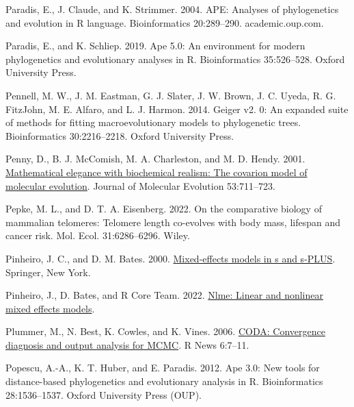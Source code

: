 \documentclass[fleqn,10pt,lineno]{wlpeerj} %
\newlength{\cslhangindent}
\newlength{\cslentryspacingunit} %
\newenvironment{CSLReferences}[2] %
 {%
  \setlength{\parindent}{0pt}
  \ifodd #1
  \let\oldpar\par
  \def\par{\hangindent=\cslhangindent\oldpar}
  \fi
  \setlength{\parskip}{#2\cslentryspacingunit}
 }%
 {}
\begin{document}
\begin{CSLReferences}{1}{0}
\leavevmode{}%
Paradis, E., J. Claude, and K. Strimmer. 2004. {APE}: Analyses of phylogenetics and evolution in {R} language. Bioinformatics 20:289--290. academic.oup.com.

\leavevmode{}%
Paradis, E., and K. Schliep. 2019. Ape 5.0: An environment for modern phylogenetics and evolutionary analyses in {R}. Bioinformatics 35:526--528. Oxford University Press.

\leavevmode{}%
Pennell, M. W., J. M. Eastman, G. J. Slater, J. W. Brown, J. C. Uyeda, R. G. FitzJohn, M. E. Alfaro, and L. J. Harmon. 2014. Geiger v2. 0: An expanded suite of methods for fitting macroevolutionary models to phylogenetic trees. Bioinformatics 30:2216--2218. Oxford University Press.

\leavevmode{}%
Penny, D., B. J. McComish, M. A. Charleston, and M. D. Hendy. 2001. \href{https://doi.org/10.1007/s002390010258}{Mathematical elegance with biochemical realism: The covarion model of molecular evolution}. Journal of Molecular Evolution 53:711--723.

\leavevmode{}%
Pepke, M. L., and D. T. A. Eisenberg. 2022. On the comparative biology of mammalian telomeres: Telomere length co-evolves with body mass, lifespan and cancer risk. Mol. Ecol. 31:6286--6296. Wiley.

\leavevmode{}%
Pinheiro, J. C., and D. M. Bates. 2000. \href{https://doi.org/10.1007/b98882}{Mixed-effects models in s and s-PLUS}. Springer, New York.

\leavevmode{}%
Pinheiro, J., D. Bates, and R Core Team. 2022. \href{https://CRAN.R-project.org/package=nlme}{Nlme: Linear and nonlinear mixed effects models}.

\leavevmode{}%
Plummer, M., N. Best, K. Cowles, and K. Vines. 2006. \href{https://journal.r-project.org/archive/}{CODA: Convergence diagnosis and output analysis for MCMC}. R News 6:7--11.

\leavevmode{}%
Popescu, A.-A., K. T. Huber, and E. Paradis. 2012. Ape 3.0: New tools for distance-based phylogenetics and evolutionary analysis in {R}. Bioinformatics 28:1536--1537. Oxford University Press (OUP).


\end{CSLReferences}
\end{document}
